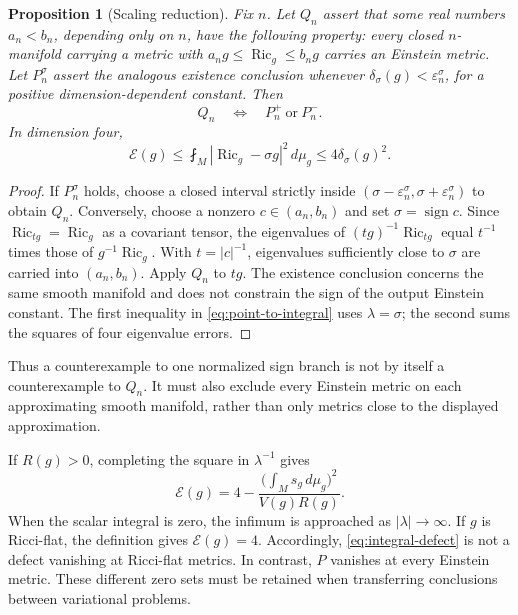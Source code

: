 \documentclass[11pt,a4paper]{article}
\newtheorem{proposition}[theorem]{Proposition}
\theoremstyle{definition}\newtheorem{definition}[theorem]{Definition}
\theoremstyle{remark}\newtheorem{remark}[theorem]{Remark}
\DeclareMathOperator{\Ric}{Ric}
\newcommand{\avint}{\mathop{\fint}}
\newcommand{\dd}{\,d\mu_g}
\newcommand{\Ecal}{\mathcal E}
\begin{document}
\begin{proposition}[Scaling reduction]\label{prop:normalization}
Fix $n$. Let $Q_n$ assert that some real numbers $a_n<b_n$, depending only on $n$, have the following property: every closed $n$-manifold carrying a metric with $a_ng\le\Ric_g\le b_ng$ carries an Einstein metric. Let $P_n^\sigma$ assert the analogous existence conclusion whenever $\delta_\sigma(g)<\varepsilon_n^\sigma$, for a positive dimension-dependent constant. Then
\[
 Q_n\quad\Longleftrightarrow\quad P_n^+\ \text{or}\ P_n^-.
\]
In dimension four,
\begin{equation}\label{eq:point-to-integral}
 \Ecal(g)\le\avint_M|\Ric_g-\sigma g|^2\dd
                \le4\delta_\sigma(g)^2.
\end{equation}
\end{proposition}
\begin{proof}
If $P_n^\sigma$ holds, choose a closed interval strictly inside $(\sigma-\varepsilon_n^\sigma,\sigma+\varepsilon_n^\sigma)$ to obtain $Q_n$. Conversely, choose a nonzero $c\in(a_n,b_n)$ and set $\sigma=\operatorname{sign}c$. Since $\Ric_{tg}=\Ric_g$ as a covariant tensor, the eigenvalues of $(tg)^{-1}\Ric_{tg}$ equal $t^{-1}$ times those of $g^{-1}\Ric_g$. With $t=|c|^{-1}$, eigenvalues sufficiently close to $\sigma$ are carried into $(a_n,b_n)$. Apply $Q_n$ to $tg$. The existence conclusion concerns the same smooth manifold and does not constrain the sign of the output Einstein constant. The first inequality in \eqref{eq:point-to-integral} uses $\lambda=\sigma$; the second sums the squares of four eigenvalue errors.
\end{proof}
Thus a counterexample to one normalized sign branch is not by itself a counterexample to $Q_n$. It must also exclude every Einstein metric on each approximating smooth manifold, rather than only metrics close to the displayed approximation.

If $R(g)>0$, completing the square in $\lambda^{-1}$ gives
\begin{equation}\label{eq:E-formula}
 \Ecal(g)=4-\frac{\bigl(\int_Ms_g\dd\bigr)^2}{V(g)R(g)}.
\end{equation}
When the scalar integral is zero, the infimum is approached as $|\lambda|\to\infty$. If $g$ is Ricci-flat, the definition gives $\Ecal(g)=4$. Accordingly, \eqref{eq:integral-defect} is not a defect vanishing at Ricci-flat metrics. In contrast, $P$ vanishes at every Einstein metric. These different zero sets must be retained when transferring conclusions between variational problems.
\end{document}
